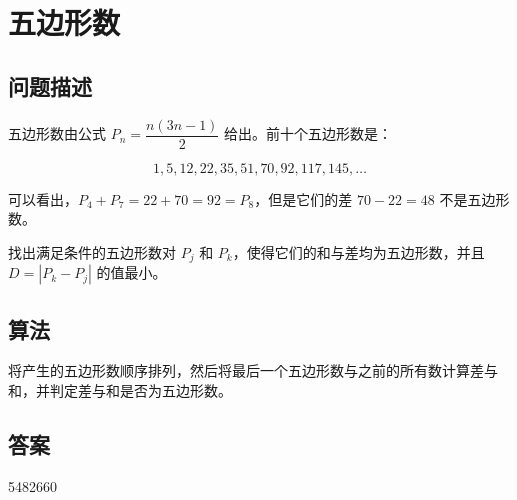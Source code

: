 \section{五边形数}
\subsection{问题描述}
\begin{tcolorbox}
	五边形数由公式 $P_n = \dfrac{n(3n-1)}{2}$ 给出。前十个五边形数是：

	\[
		1, 5, 12, 22, 35, 51, 70, 92, 117, 145, \dots
	\]

	可以看出，$P_4 + P_7 = 22 + 70 = 92 = P_8$，但是它们的差 $70 - 22 = 48$ 不是五边形数。

	找出满足条件的五边形数对 $P_j$ 和 $P_k$，使得它们的和与差均为五边形数，并且 $D = |P_k - P_j|$ 的值最小。
\end{tcolorbox}

\subsection{算法}
将产生的五边形数顺序排列，然后将最后一个五边形数与之前的所有数计算差与和，并判定差与和是否为五边形数。

\subsection{答案}
5482660
